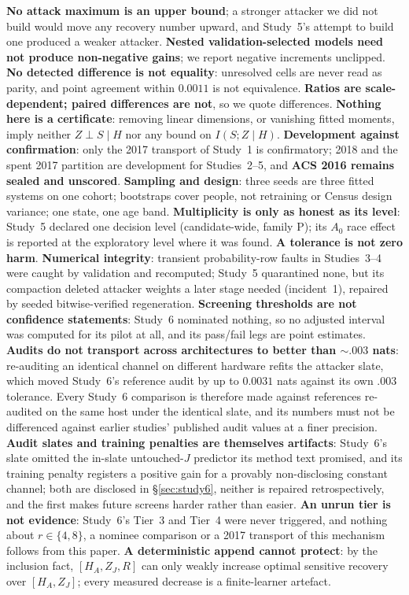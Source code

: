 \documentclass[10pt]{article}
\begin{document}
\textbf{No attack maximum is an upper bound}; a stronger attacker we did not build would move any recovery
number upward, and Study~5's attempt to build one produced a weaker attacker. \textbf{Nested
validation-selected models need not produce non-negative gains}; we report negative increments unclipped.
\textbf{No detected difference is not equality}: unresolved cells are never read as parity, and point
agreement within $0.0011$ is not equivalence. \textbf{Ratios are scale-dependent; paired differences are
not}, so we quote differences. \textbf{Nothing here is a certificate}: removing linear dimensions, or vanishing
fitted moments, imply neither $Z\perp S\mid H$ nor any bound on $I(S;Z\mid H)$. \textbf{Development against
confirmation}: only the 2017 transport of Study~1 is confirmatory; 2018 and the spent 2017 partition are
development for Studies~2--5, and \textbf{ACS 2016 remains sealed and unscored}. \textbf{Sampling and design}:
three seeds are three fitted systems on one cohort; bootstraps cover people, not retraining or Census design
variance; one state, one age band. \textbf{Multiplicity is only as honest as its level}: Study~5 declared one
decision level (candidate-wide, family P); its $A_0$ race effect is reported at the exploratory level where it
was found. \textbf{A tolerance is not zero harm}. \textbf{Numerical integrity}: transient probability-row
faults in Studies~3--4 were caught by validation and recomputed; Study~5 quarantined none, but its compaction
deleted attacker weights a later stage needed (incident~1), repaired by seeded bitwise-verified regeneration.
\textbf{Screening thresholds are not confidence statements}: Study~6 nominated nothing, so no adjusted
interval was computed for its pilot at all, and its pass/fail legs are point estimates. \textbf{Audits do not
transport across architectures to better than $\sim.003$ nats}: re-auditing an identical channel on different
hardware refits the attacker slate, which moved Study~6's reference audit by up to $0.0031$ nats against its
own $.003$ tolerance. Every Study~6 comparison is therefore made against references re-audited on the same
host under the identical slate, and its numbers must not be differenced against earlier studies' published
audit values at a finer precision. \textbf{Audit slates and training penalties are themselves artifacts}: Study~6's slate omitted the in-slate
untouched-$J$ predictor its method text promised, and its training penalty registers a positive gain for a
provably non-disclosing constant channel; both are disclosed in \S\ref{sec:study6}, neither is repaired
retrospectively, and the first makes future screens harder rather than easier. \textbf{An unrun tier is not
evidence}: Study~6's Tier~3 and Tier~4 were
never triggered, and nothing about $r\in\{4,8\}$, a nominee comparison or a 2017 transport of this mechanism
follows from this paper. \textbf{A deterministic append cannot protect}: by the inclusion fact, $[H_A,Z_J,R]$
can only weakly increase optimal sensitive recovery over $[H_A,Z_J]$; every measured decrease is a
finite-learner artefact.
\end{document}
